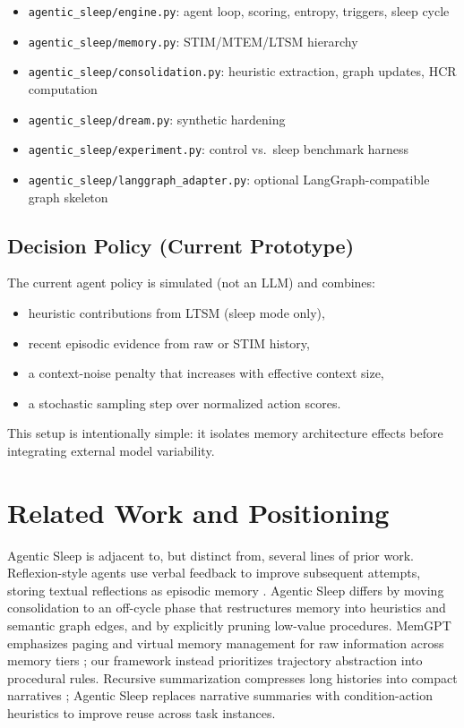 \documentclass{article}
\begin{document}
\begin{itemize}[leftmargin=1.25em]
\item \texttt{agentic\_sleep/engine.py}: agent loop, scoring, entropy, triggers, sleep cycle
\item \texttt{agentic\_sleep/memory.py}: STIM/MTEM/LTSM hierarchy
\item \texttt{agentic\_sleep/consolidation.py}: heuristic extraction, graph updates, HCR computation
\item \texttt{agentic\_sleep/dream.py}: synthetic hardening
\item \texttt{agentic\_sleep/experiment.py}: control vs.\ sleep benchmark harness
\item \texttt{agentic\_sleep/langgraph\_adapter.py}: optional LangGraph-compatible graph skeleton
\end{itemize}

\subsection{Decision Policy (Current Prototype)}

The current agent policy is simulated (not an LLM) and combines:

\begin{itemize}[leftmargin=1.25em]
\item heuristic contributions from LTSM (sleep mode only),
\item recent episodic evidence from raw or STIM history,
\item a context-noise penalty that increases with effective context size,
\item a stochastic sampling step over normalized action scores.
\end{itemize}

This setup is intentionally simple: it isolates memory architecture effects before integrating external model variability.

\section{Related Work and Positioning}

Agentic Sleep is adjacent to, but distinct from, several lines of prior work. Reflexion-style agents use verbal feedback to improve subsequent attempts, storing textual reflections as episodic memory \citep{shinn2023reflexion}. Agentic Sleep differs by moving consolidation to an off-cycle phase that restructures memory into heuristics and semantic graph edges, and by explicitly pruning low-value procedures. MemGPT emphasizes paging and virtual memory management for raw information across memory tiers \citep{packer2023memgpt}; our framework instead prioritizes trajectory abstraction into procedural rules. Recursive summarization compresses long histories into compact narratives \citep{wang2023recursive_summary_memory}; Agentic Sleep replaces narrative summaries with condition-action heuristics to improve reuse across task instances.
\end{document}
